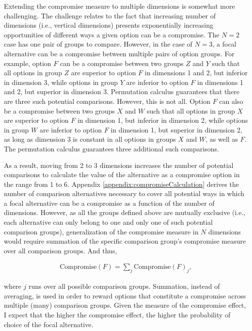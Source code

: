 \documentclass[a4paper,12pt]{article}
\begin{document}
Extending the compromise measure to multiple dimensions is somewhat more challenging. The challenge relates to the fact that increasing number of dimensions (i.e., vertical dimensions) presents exponentially increasing opportunities of different ways a given option can be a compromise. The $N = 2$ case has one pair of groups to compare. However, in the case of $N = 3$, a focal alternative can be a compromise between multiple pairs of option groups. For example, option $F$ can be a compromise between two groups $Z$ and $Y$ such that all options in group $Z$ are superior to option $F$ in dimensions 1 and 2, but inferior in dimension 3, while options in group $Y$ are inferior to option $F$ in dimensions 1 and 2, but superior in dimension 3. Permutation calculus guarantees that there are three such potential comparisons. However, this is not all. Option $F$ can also be a compromise between two groups $X$ and $W$ such that all options in group $X$ are superior to option $F$ in dimension 1, but inferior in dimension 2, while options in group $W$ are inferior to option $F$ in dimension 1, but superior in dimension 2, as long as dimension 3 is constant in all options in groups $X$ and $W$, as well as $F$. The permutation calculus guarantees three additional such comparisons.

As a result, moving from 2 to 3 dimensions increases the number of potential comparisons to calculate the value of the alternative as a compromise option in the range from 1 to 6. Appendix \ref{appendix:compromiseCalculation} derives the number of comparison alternatives necessary to cover all potential ways in which a focal alternative can be a compromise as a function of the number of dimensions. However, as all the groups defined above are mutually exclusive (i.e., each alternative can only belong to one and only one of such potential comparison groups), generalization of the compromise measure in $N$ dimensions would require summation of the specific comparison group's compromise measure over all comparison groups. And thus,

\begin{align}\label{eq:compromiseEffectGeneralFormula}
    \text{Compromise}(F) = \sum_j \text{Compromise}(F)_j ,
\end{align}


 where $j$ runs over all possible comparison groups. Summation, instead of averaging, is used in order to reward options that constitute a compromise across multiple (many) comparison groups. Given the measure of the compromise effect, I expect that the higher the compromise effect, the higher the probability of choice of the focal alternative.    
\end{document}

